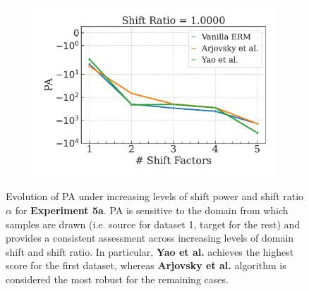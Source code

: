 \begin{figure}[H]
\begin{subfigure}[b]{0.32\textwidth}
        \includegraphics[width=\textwidth]{img/results_discussion/datashift/paper_nonpaired_sel=acc_met=PA_sr=1.0.pdf}
    \end{subfigure}

    \caption{
    Evolution of PA under increasing levels of shift power and shift ratio $\alpha$ for \textbf{Experiment 5a}. PA is sensitive to
    the domain from which samples are drawn (i.e. source for dataset 1, target for the rest) and provides
    a consistent assessment across increasing levels of domain shift and shift ratio. In particular, 
    {\color{tab:green} \textbf{Yao et al.}} achieves the highest score for the first dataset, whereas
    {\color{tab:orange} \textbf{Arjovsky et al.}} algorithm is considered the most robust for the remaining cases.
    }
    \label{fig:pa_datashift_nonpaired}
\end{figure}

